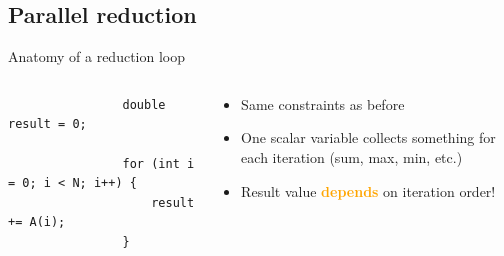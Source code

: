 \documentclass[aspectratio=169]{beamer}
\newcommand{\highlight}[1]{\textcolor{orange}{\textbf{#1}}}
\begin{document}

\subsection[Parallel reduction]{Parallel reduction}


\begin{frame}[fragile]{Anatomy of a reduction loop}
    \begin{columns}
        \begin{column}{0.5\linewidth}
            \begin{verbatim}
                double result = 0;

                for (int i = 0; i < N; i++) {
                    result += A(i);
                }
            \end{verbatim}
        \end{column}
        \begin{column}{0.5\linewidth}
            \begin{itemize}
                \item Same constraints as before
                \item One scalar variable collects something for each iteration (sum, max, min, etc.)
                \item Result value \highlight{depends} on iteration order!
            \end{itemize}
        \end{column}
    \end{columns}
\end{frame}

\end{document}
